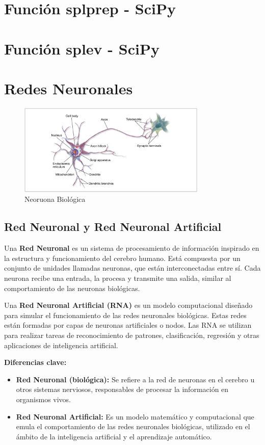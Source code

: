 \documentclass[12pt]{article}
\begin{document}
\section{Función splprep - SciPy}
  
\section{Función splev - SciPy}
  


\section{Redes Neuronales}
  \begin{figure}[ht]
    \centering
    \includegraphics[width=0.8\textwidth]{./Imagenes/NeuronaBiologica.png}
    \caption{Neoruona Biológica}
    \label{fig:second}
  \end{figure}
  
  \subsection{Red Neuronal y Red Neuronal Artificial}
  Una \textbf{Red Neuronal} es un sistema de procesamiento de información inspirado en la estructura y 
  funcionamiento del cerebro humano. Está compuesta por un conjunto de unidades llamadas neuronas, 
  que están interconectadas entre sí. Cada neurona recibe una entrada, la procesa y transmite una 
  salida, similar al comportamiento de las neuronas biológicas.\par
  \medskip \noindent
  Una \textbf{Red Neuronal Artificial (RNA)} es un modelo computacional diseñado para simular el funcionamiento 
  de las redes neuronales biológicas. Estas redes están formadas por capas de neuronas artificiales o nodos. 
  Las RNA se utilizan para realizar tareas de reconocimiento de patrones, clasificación, regresión y otras aplicaciones 
  de inteligencia artificial.\par
  \medskip
  \textbf{Diferencias clave:}
  \begin{itemize}
    \item \textbf{Red Neuronal (biológica):} Se refiere a la red de neuronas en el cerebro u otros sistemas nerviosos, responsables de 
    procesar la información en organismos vivos.
    \item \textbf{Red Neuronal Artificial:} Es un modelo matemático y computacional que emula el comportamiento de las redes 
    neuronales biológicas, utilizado en el ámbito de la inteligencia artificial y el aprendizaje automático.
  \end{itemize}
\end{document}
